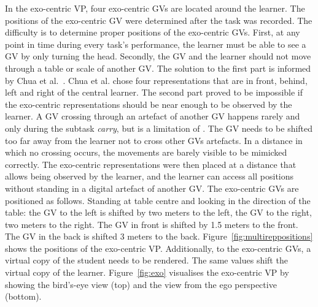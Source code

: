 In the exo-centric VP, four exo-centric GVs are located around the learner. The positions of the exo-centric GV were determined after the task was recorded. The difficulty is to determine proper positions of the exo-centric GVs. First, at any point in time during every task's performance, the learner must be able to see a GV by only turning the head. Secondly, the GV and the learner should not move through a table or scale of another GV. The solution to the first part is informed by Chua et al.~\cite{thaichichua}. Chua et al. chose four representations that are in front, behind, left and right of the central learner. The second part proved to be impossible if the exo-centric representations should be near enough to be observed by the learner. A GV crossing through an artefact of another GV happens rarely and only during the subtask \textit{carry}, but is a limitation of \exgo. The GV needs to be shifted too far away from the learner not to cross other GVs artefacts. In a distance in which no crossing occurs, the movements are barely visible to be mimicked correctly. The exo-centric representations were then placed at a distance that allows being observed by the learner, and the learner can access all positions without standing in a digital artefact of another GV. The exo-centric GVs are positioned as follows. Standing at table centre and looking in the direction of the table: the GV to the left is shifted by two meters to the left, the GV to the right, two meters to the right. The GV in front is shifted by 1.5 meters to the front. The GV in the back is shifted 3 meters to the back. Figure~\ref{fig:multireppositions} shows the positions of the exo-centric VP. Additionally, to the exo-centric GVs, a virtual copy of the student needs to be rendered. The same values shift the virtual copy of the learner. Figure~\ref{fig:exo} visualises the exo-centric VP by showing the bird's-eye view (top) and the view from the ego perspective (bottom).\\

